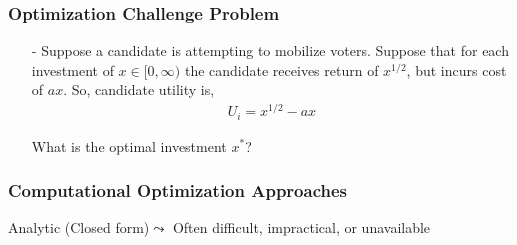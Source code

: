 \documentclass{beamer}
\numberwithin{equation}{section}
\begin{document}
\begin{frame}
\frametitle{Optimization \alert{Challenge} Problem}



\begin{itemize}
\item[-] Suppose a candidate is attempting to mobilize voters.  Suppose that for each investment of $x \in [0, \infty)$ the candidate receives
return of $x^{1/2}$, but incurs cost of $a x$.  So, candidate utility is, 
\begin{eqnarray}
U_{i} = x^{1/2}  - a x \nonumber 
\end{eqnarray}
\item[] What is the optimal investment $x^{*}$?

\end{itemize}

\begin{center}
\end{center}


\end{frame}


\begin{frame}
\frametitle{Computational Optimization Approaches}

\alert{Analytic} (Closed form)$\leadsto$ Often difficult, impractical, or unavailable  \pause \\

\pause{} \pause 
\begin{itemize}
 \pause 
\begin{itemize}
 \pause 
{} \pause 
{} \pause 
{} \pause 
{} 
\end{itemize}
\end{itemize}
\end{frame}
\end{document}

